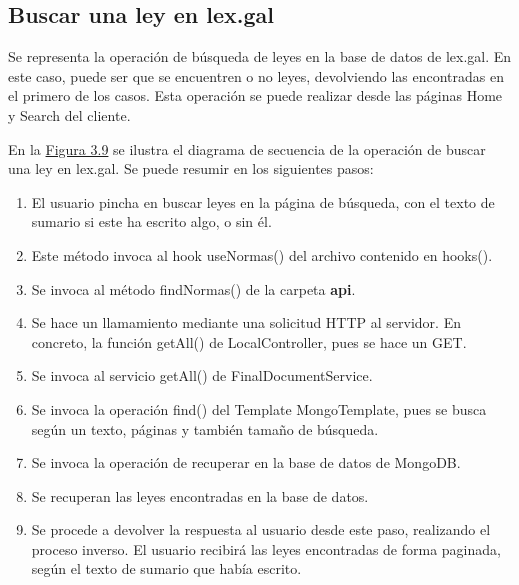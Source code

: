 \subsection{Buscar una ley en lex.gal}

Se representa la operación de búsqueda de leyes en la base de datos de lex.gal. En este caso, puede ser que se encuentren o no leyes, devolviendo las encontradas en el primero de los casos. Esta operación se puede realizar desde las páginas Home y Search del cliente.



En la \hyperref[enlaceDRegistro]{Figura 3.9} se ilustra el diagrama de secuencia de la operación de buscar una ley en lex.gal. Se puede resumir en los siguientes pasos:

\begin{enumerate}
    \item El usuario pincha en buscar leyes en la página de búsqueda, con el texto de sumario si este ha escrito algo, o sin él.
    \item Este método invoca al hook useNormas() del archivo contenido en hooks().
    \item Se invoca al método findNormas() de la carpeta {\bf api}.
    \item Se hace un llamamiento mediante una solicitud HTTP al servidor. En concreto, la función getAll() de LocalController, pues se hace un GET.
    \item Se invoca al servicio getAll() de FinalDocumentService.
    \item Se invoca la operación find() del Template MongoTemplate, pues se busca según un texto, páginas y también tamaño de búsqueda.
    \item Se invoca la operación de recuperar en la base de datos de MongoDB.
    \item Se recuperan las leyes encontradas en la base de datos.
    \item Se procede a devolver la respuesta al usuario desde este paso, realizando el proceso inverso. El usuario recibirá las leyes encontradas de forma paginada, según el texto de sumario que había escrito.
\end{enumerate}